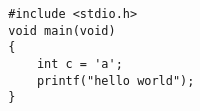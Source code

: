 \documentclass[nofonts]{ctexart}
\begin{document}
    \begin{verbatim}
        #include <stdio.h>
        void main(void)
        {
            int c = 'a';
            printf("hello world");
        }
    \end{verbatim}
\end{document}
